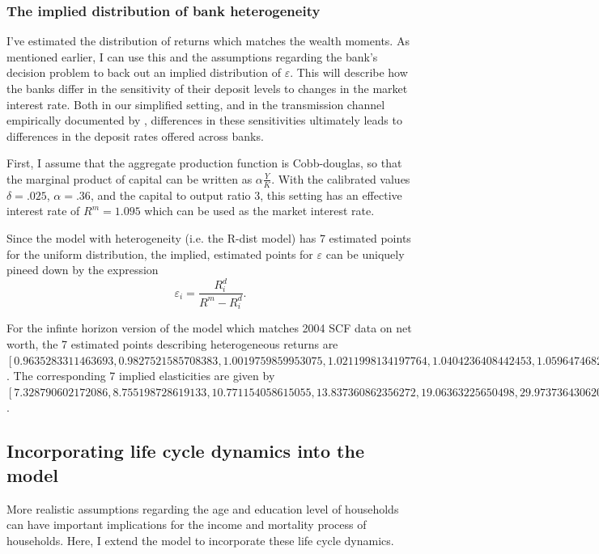  \subsubsection{The implied distribution of bank heterogeneity}

  \par I've estimated the distribution of returns which matches the wealth moments. As mentioned earlier, I can use this and the assumptions regarding the bank's decision problem to back out an implied distribution of $\varepsilon$. This will describe how the banks differ in the sensitivity of their deposit levels to changes in the market interest rate. Both in our simplified setting, and in the transmission channel empirically documented by \cite{Drechsler2017}, differences in these sensitivities ultimately leads to differences in the deposit rates offered across banks.  

  \par First, I assume that the aggregate production function is Cobb-douglas, so that the marginal product of capital can be written as $\alpha \frac{Y}{K}$. With the calibrated values  $\delta = .025$, $\alpha = .36$, and the capital to output ratio $3$, this setting has an effective interest rate of $R^m = 1.095$ which can be used as the market interest rate.

  \par Since the model with heterogeneity (i.e. the R-dist model) has 7 estimated points for the uniform distribution, the implied, estimated points for $\varepsilon$ can be uniquely pineed down by the expression $$\varepsilon_i = \frac{R_i^d}{R^m - R_i^d} .$$

  \par For the infinte horizon version of the model which matches 2004 SCF data on net worth, the 7 estimated points describing heterogeneous returns are $[0.9635283311463693, 0.9827521585708383, 1.0019759859953075, 1.0211998134197764, 1.0404236408442453, 1.0596474682687145, 1.0788712956931834]$. The corresponding 7 implied elasticities are given by $[7.328790602172086, 8.755198728619133, 10.771154058615055, 13.837360862356272, 19.06363225650498, 29.973736430620928, 66.89138043390217]$.

 
\subsection{Incorporating life cycle dynamics into the model}

\par More realistic assumptions regarding the age and education level of households can have important implications for the income and mortality process of households. Here, I extend the model to incorporate these life cycle dynamics.

